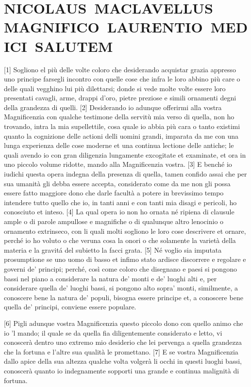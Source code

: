 \section*{NICOLAUS~MACLAVELLUS MAGNIFICO~LAURENTIO~MEDICI~SALUTEM}

{[}1{]} Sogliono el più delle volte coloro che desiderando acquistar
grazia appresso uno principe farsegli incontro con quelle cose che infra
le loro abbino più care o delle quali vegghino lui più dilettarsi; donde
si vede molte volte essere loro presentati cavagli, arme, drappi d'oro,
pietre preziose e simili ornamenti degni della grandezza di quelli.
{[}2{]} Desiderando io adunque offerirmi alla vostra Magnificenzia con
qualche testimone della servitù mia verso di quella, non ho trovando,
intra la mia supellettile, cosa quale io abbia più cara o tanto existimi
quanto la cognizione delle actioni delli uomini grandi, imparata da me
con una lunga experienza delle cose moderne et una continua lectione
delle antiche; le quali avendo io con gran diligenzia lungamente
excogitate et examinate, et ora in uno piccolo volume ridotte, mando
alla Magnificenzia vostra. {[}3{]} E benché io iudichi questa opera
indegna della presenza di quella, tamen confido assai che per sua
umanità gli debba essere accepta, considerato come da me non gli possa
essere fatto maggiore dono che darle facultà a potere in brevissimo
tempo intendere tutto quello che io, in tanti anni e con tanti mia
disagi e pericoli, ho conosciuto et inteso. {[}4{]} La qual opera io non
ho ornata né ripiena di clausule ample o di parole ampullose e
magnifiche o di qualunque altro lenocinio o ornamento extrinseco, con li
quali molti sogliono le loro cose descrivere et ornare, perché io ho
voluto o che veruna cosa la onori o che solamente la varietà della
materia e la gravitá del subietto la facci grata. {[}5{]} Né voglio sia
imputata prosumptione se uno uomo di basso et infimo stato ardisce
discorrere e regolare e governi de' principi; perché, così come coloro
che disegnano e paesi si pongono bassi nel piano a considerare la natura
de' monti e de' luoghi alti e, per considerare quella de' luoghi bassi,
si pongono alto sopra' monti, similmente, a conoscere bene la natura de'
populi, bisogna essere principe et, a conoscere bene quella de'
principi, conviene essere populare.

{[}6{]} Pigli adunque vostra Magnificenzia questo piccolo dono con
quello animo che io 'l mando; il quale se da quella fia diligentemente
considerato e letto, vi conoscerà dentro uno extremo mio desiderio che
lei pervenga a quella grandezza che la fortuna e l'altre sua qualità le
promettano. {[}7{]} E se vostra Magnificenzia dallo apice della sua
altezza qualche volta volgerà li occhi in questi luoghi bassi, conoscerà
quanto io indegnamente sopporti una grande e continua malignità di
fortuna.

